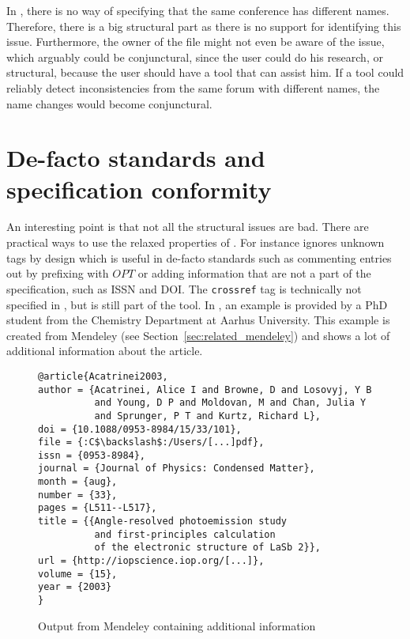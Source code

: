 In {\bibtex}, there is no way of specifying that the same conference
has different names.  Therefore, there is a big structural part as
there is no support for identifying this issue.  Furthermore, the
owner of the {\bibtex} file might not even be aware of the issue,
which arguably could be conjunctural, since the user could do his
research, or structural, because the user should have a tool that can
assist him.  If a tool could reliably detect inconsistencies from the
same forum with different names, the name changes would become
conjunctural.


\section{De-facto standards and specification conformity}
\label{sec:problems_de_facto}

An interesting point is that not all the structural issues are bad.
There are practical ways to use the relaxed properties of {\bibtex}.
For instance {\bibtex} ignores unknown tags by design which is useful
in de-facto standards such as commenting entries out by prefixing with
$OPT$ or adding information that are not a part of the {\bibtex}
specification, such as ISSN and DOI.  The \texttt{crossref} tag is
technically not specified in {\bibtex}, but is still part of the tool.
In , an example is provided by a PhD
student from the Chemistry Department at Aarhus University.  This
example is created from Mendeley (see
Section~\ref{sec:related_mendeley}) and shows a lot of additional
information about the article.

\begin{figure}
  \centering
\begin{small}
\begin{verbatim}
@article{Acatrinei2003,
author = {Acatrinei, Alice I and Browne, D and Losovyj, Y B
          and Young, D P and Moldovan, M and Chan, Julia Y
          and Sprunger, P T and Kurtz, Richard L},
doi = {10.1088/0953-8984/15/33/101},
file = {:C$\backslash$:/Users/[...]pdf},
issn = {0953-8984},
journal = {Journal of Physics: Condensed Matter},
month = {aug},
number = {33},
pages = {L511--L517},
title = {{Angle-resolved photoemission study
          and first-principles calculation
          of the electronic structure of LaSb 2}},
url = {http://iopscience.iop.org/[...]},
volume = {15},
year = {2003}
}
\end{verbatim}
\end{small}
  \caption{Output from Mendeley containing additional information}
\label{fig:mendeley_output}
\end{figure}


